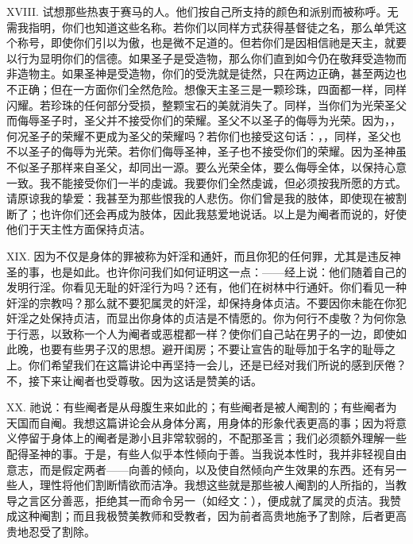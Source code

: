 XVIII. 试想那些热衷于赛马的人。他们按自己所支持的颜色和派别而被称呼。无需我指明，你们也知道这些名称。若你们以同样方式获得基督徒之名，那么单凭这个称号，即使你们引以为傲，也是微不足道的。但若你们是因相信祂是天主，就要以行为显明你们的信德。如果圣子是受造物，那么你们直到如今仍在敬拜受造物而非造物主。如果圣神是受造物，你们的受洗就是徒然，只在两边正确，甚至两边也不正确；但在一方面你们全然危险。想像天主圣三是一颗珍珠，四面都一样，同样闪耀。若珍珠的任何部分受损，整颗宝石的美就消失了。同样，当你们为光荣圣父而侮辱圣子时，圣父并不接受你们的荣耀。圣父不以圣子的侮辱为光荣。因为，，何况圣子的荣耀不更成为圣父的荣耀吗？若你们也接受这句话：，，同样，圣父也不以圣子的侮辱为光荣。若你们侮辱圣神，圣子也不接受你们的荣耀。因为圣神虽不似圣子那样来自圣父，却同出一源。要么光荣全体，要么侮辱全体，以保持心意一致。我不能接受你们一半的虔诚。我要你们全然虔诚，但必须按我所愿的方式。请原谅我的挚爱：我甚至为那些恨我的人悲伤。你们曾是我的肢体，即使现在被割断了；也许你们还会再成为肢体，因此我慈爱地说话。以上是为阉者而说的，好使他们于天主性方面保持贞洁。\par

XIX. 因为不仅是身体的罪被称为奸淫和通奸，而且你犯的任何罪，尤其是违反神圣的事，也是如此。也许你问我们如何证明这一点：——经上说：他们随着自己的发明行淫。你看见无耻的奸淫行为吗？还有，他们在树林中行通奸。你们看见一种奸淫的宗教吗？那么就不要犯属灵的奸淫，却保持身体贞洁。不要因你未能在你犯奸淫之处保持贞洁，而显出你身体的贞洁是不情愿的。你为何行不虔敬？为何你急于行恶，以致称一个人为阉者或恶棍都一样？使你们自己站在男子的一边，即使如此晚，也要有些男子汉的思想。避开闺房；不要让宣告的耻辱加于名字的耻辱之上。你们希望我们在这篇讲论中再坚持一会儿，还是已经对我们所说的感到厌倦？不，接下来让阉者也受尊敬。因为这话是赞美的话。\par

XX. 祂说：有些阉者是从母腹生来如此的；有些阉者是被人阉割的；有些阉者为天国而自阉。我想这篇讲论会从身体分离，用身体的形象代表更高的事；因为将意义停留于身体上的阉者是渺小且非常软弱的，不配那圣言；我们必须额外理解一些配得圣神的事。于是，有些人似乎本性倾向于善。当我说本性时，我并非轻视自由意志，而是假定两者——向善的倾向，以及使自然倾向产生效果的东西。还有另一些人，理性将他们割断情欲而洁净。我想这些就是那些被人阉割的人所指的，当教导之言区分善恶，拒绝其一而命令另一（如经文：），便成就了属灵的贞洁。我赞成这种阉割；而且我极赞美教师和受教者，因为前者高贵地施予了割除，后者更高贵地忍受了割除。\par

